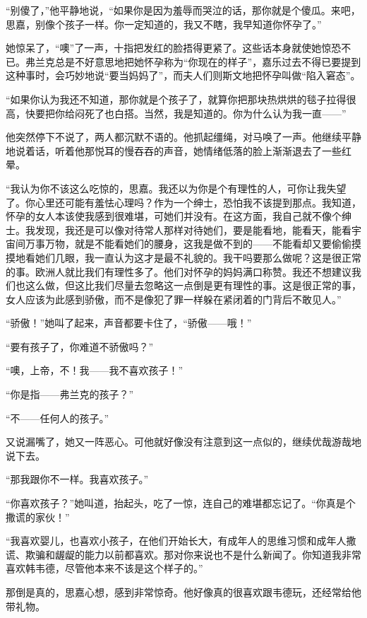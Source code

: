 \par “别傻了，”他平静地说，“如果你是因为羞辱而哭泣的话，那你就是个傻瓜。来吧，思嘉，别像个孩子一样。你一定知道的，我又不瞎，我早知道你怀孕了。”
\par 她惊呆了，“噢”了一声，十指把发红的脸捂得更紧了。这些话本身就使她惊恐不已。弗兰克总是不好意思地把她怀孕称为“你现在的样子”，嘉乐过去不得已要提到这种事时，会巧妙地说“要当妈妈了”，而夫人们则斯文地把怀孕叫做“陷入窘态”。
\par “如果你认为我还不知道，那你就是个孩子了，就算你把那块热烘烘的毯子拉得很高，快要把你给闷死了也白搭。当然，我是知道的。你为什么认为我一直——”
\par 他突然停下不说了，两人都沉默不语的。他抓起缰绳，对马唤了一声。他继续平静地说着话，听着他那悦耳的慢吞吞的声音，她情绪低落的脸上渐渐退去了一些红晕。
\par “我认为你不该这么吃惊的，思嘉。我还以为你是个有理性的人，可你让我失望了。你心里还可能有羞怯心理吗？作为一个绅士，恐怕我不该提到那点。我知道，怀孕的女人本该使我感到很难堪，可她们并没有。在这方面，我自己就不像个绅士。我发现，我还是可以像对待常人那样对待她们，要是能看地，能看天，能看宇宙间万事万物，就是不能看她们的腰身，这我是做不到的——不能看却又要偷偷摸摸地看她们几眼，我一直认为这才是最不礼貌的。我干吗要那么做呢？这是很正常的事。欧洲人就比我们有理性多了。他们对怀孕的妈妈满口称赞。我还不想建议我们也这么做，但这比我们尽量去忽略这一点倒是更有理性的事。这是很正常的事，女人应该为此感到骄傲，而不是像犯了罪一样躲在紧闭着的门背后不敢见人。”
\par “骄傲！”她叫了起来，声音都要卡住了，“骄傲——哦！”
\par “要有孩子了，你难道不骄傲吗？”
\par “噢，上帝，不！我——我不喜欢孩子！”
\par “你是指——弗兰克的孩子？”
\par “不——任何人的孩子。”
\par 又说漏嘴了，她又一阵恶心。可他就好像没有注意到这一点似的，继续优哉游哉地说下去。
\par “那我跟你不一样。我喜欢孩子。”
\par “你喜欢孩子？”她叫道，抬起头，吃了一惊，连自己的难堪都忘记了。“你真是个撒谎的家伙！”
\par “我喜欢婴儿，也喜欢小孩子，在他们开始长大，有成年人的思维习惯和成年人撒谎、欺骗和龌龊的能力以前都喜欢。那对你来说也不是什么新闻了。你知道我非常喜欢韩韦德，尽管他本来不该是这个样子的。”
\par 那倒是真的，思嘉心想，感到非常惊奇。他好像真的很喜欢跟韦德玩，还经常给他带礼物。
